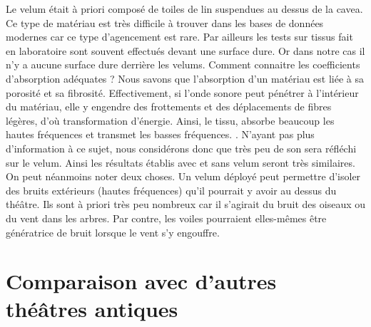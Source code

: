 Le \gls{velum} était à priori composé de toiles de lin \cite[p.38]{formige} suspendues au dessus de la \gls{cavea}. Ce type de matériau est très difficile à trouver dans les bases de données modernes car ce type d'agencement est rare. Par ailleurs les tests sur tissus fait en laboratoire sont souvent effectués devant une surface dure. Or dans notre cas il n'y a aucune surface dure derrière les \glspl{velum}. Comment connaitre les coefficients d'absorption adéquates ? Nous savons que l'absorption d'un matériau est liée à sa porosité et sa fibrosité. Effectivement, si l'onde sonore peut pénétrer à l'intérieur du matériau, elle y engendre des frottements et des déplacements de fibres légères, d'où transformation d'énergie. Ainsi, le tissu, absorbe beaucoup les hautes fréquences et transmet les basses fréquences. \cite[Matériaux]{acouphile}. N'ayant pas plus d'information à ce sujet, nous considérons donc que très peu de son sera réfléchi sur le \gls{velum}. Ainsi les résultats établis avec et sans \gls{velum} seront très similaires. On peut néanmoins noter deux choses. Un \gls{velum} déployé peut permettre d'isoler des bruits extérieurs (hautes fréquences) qu'il pourrait y avoir au dessus du théâtre. Ils sont à priori très peu nombreux car il s'agirait du bruit des oiseaux ou du vent dans les arbres. Par contre, les voiles pourraient elles-mêmes être génératrice de bruit lorsque le vent s'y engouffre.




\newpage

\chapter{Comparaison avec d'autres théâtres antiques}
\minitoc
\newpage

